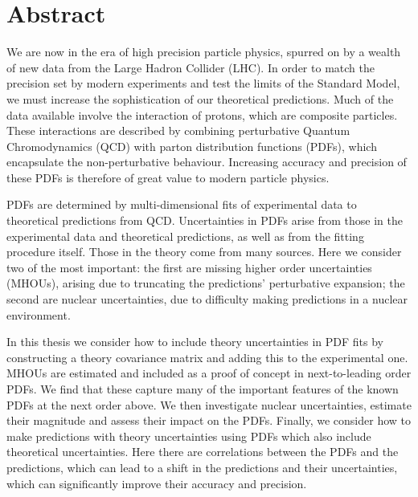 \chapter{Abstract}
We are now in the era of high precision particle physics, spurred on by a wealth of new data from the Large Hadron Collider (LHC). In order to match the precision set by modern experiments and test the limits of the Standard Model, we must increase the sophistication of our theoretical predictions. Much of the data available involve the interaction of protons, which are composite particles. These interactions are described by combining perturbative Quantum Chromodynamics (QCD) with parton distribution functions (PDFs), which encapsulate the non-perturbative behaviour. Increasing accuracy and precision of these PDFs is therefore of great value to modern particle physics.

PDFs are determined by multi-dimensional fits of experimental data to theoretical predictions from QCD. Uncertainties in PDFs arise from those in the experimental data and theoretical predictions, as well as from the fitting procedure itself. Those in the theory come from many sources. Here we consider two of the most important: the first are missing higher order uncertainties (MHOUs), arising due to truncating the predictions' perturbative expansion; the second are nuclear uncertainties, due to difficulty making predictions in a nuclear environment.

In this thesis we consider how to include theory uncertainties in PDF fits by constructing a theory covariance matrix and adding this to the experimental one. MHOUs are estimated and included as a proof of concept in next-to-leading order PDFs. We find that these capture many of the important features of the known PDFs at the next order above. We then investigate nuclear uncertainties, estimate their magnitude and assess their impact on the PDFs. Finally, we consider how to make predictions with theory uncertainties using PDFs which also include theoretical uncertainties. Here there are correlations between the PDFs and the predictions, which can lead to a shift in the predictions and their uncertainties, which can significantly improve their accuracy and precision.
